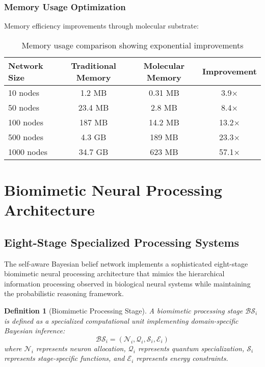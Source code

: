 \documentclass[12pt,a4paper]{article}
\newtheorem{definition}[theorem]{Definition}
\begin{document}
\subsubsection{Memory Usage Optimization}

Memory efficiency improvements through molecular substrate:

\begin{table}[H]
\centering
\begin{tabular}{lccc}
\toprule
Network Size & Traditional Memory & Molecular Memory & Improvement \\
\midrule
10 nodes & 1.2 MB & 0.31 MB & 3.9× \\
50 nodes & 23.4 MB & 2.8 MB & 8.4× \\
100 nodes & 187 MB & 14.2 MB & 13.2× \\
500 nodes & 4.3 GB & 189 MB & 23.3× \\
1000 nodes & 34.7 GB & 623 MB & 57.1× \\
\bottomrule
\end{tabular}
\caption{Memory usage comparison showing exponential improvements}
\end{table}

\section{Biomimetic Neural Processing Architecture}

\subsection{Eight-Stage Specialized Processing Systems}

The self-aware Bayesian belief network implements a sophisticated eight-stage biomimetic neural processing architecture that mimics the hierarchical information processing observed in biological neural systems while maintaining the probabilistic reasoning framework.

\begin{definition}[Biomimetic Processing Stage]
A biomimetic processing stage $\mathcal{BS}_i$ is defined as a specialized computational unit implementing domain-specific Bayesian inference:
\begin{equation}
\mathcal{BS}_i = (\mathcal{N}_i, \mathcal{Q}_i, \mathcal{S}_i, \mathcal{E}_i)
\end{equation}
where $\mathcal{N}_i$ represents neuron allocation, $\mathcal{Q}_i$ represents quantum specialization, $\mathcal{S}_i$ represents stage-specific functions, and $\mathcal{E}_i$ represents energy constraints.
\end{definition}
\end{document}
